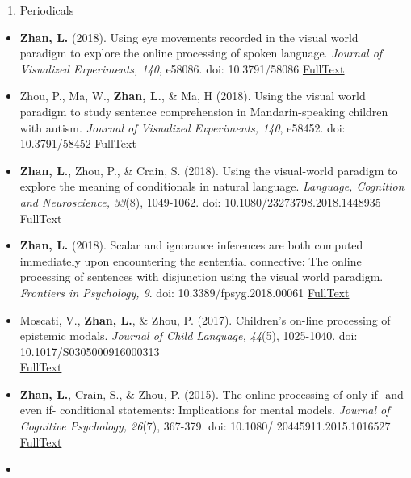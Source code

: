 \documentclass[10pt,]{article}
\providecommand{\tightlist}{%
  \setlength{\itemsep}{0pt}\setlength{\parskip}{0pt}}
\begin{document}
\begin{enumerate}
\def\labelenumi{\arabic{enumi}.}
\setcounter{enumi}{1}
\tightlist
\item
  Periodicals
\end{enumerate}

\begin{itemize}
\item
  \textbf{Zhan, L.} (2018). Using eye movements recorded in the visual
  world paradigm to explore the online processing of spoken language.
  \emph{Journal of Visualized Experiments, 140}, e58086. doi:
  10.3791/58086
  \href{https://publications.likan.info/jove-protocol-58086.pdf}{FullText}
\item
  Zhou, P., Ma, W., \textbf{Zhan, L.}, \& Ma, H (2018). Using the visual
  world paradigm to study sentence comprehension in Mandarin-speaking
  children with autism. \emph{Journal of Visualized Experiments, 140},
  e58452. doi: 10.3791/58452
  \href{https://publications.likan.info/jove-protocol-58452.pdf}{FullText}
\item
  \textbf{Zhan, L.}, Zhou, P., \& Crain, S. (2018). Using the
  visual-world paradigm to explore the meaning of conditionals in
  natural language. \emph{Language, Cognition and Neuroscience, 33}(8),
  1049-1062. doi: 10.1080/23273798.2018.1448935
  \href{https://publications.likan.info/LangCognNeurosci2018.pdf}{FullText}
\item
  \textbf{Zhan, L.} (2018). Scalar and ignorance inferences are both
  computed immediately upon encountering the sentential connective: The
  online processing of sentences with disjunction using the visual world
  paradigm. \emph{Frontiers in Psychology, 9}. doi:
  10.3389/fpsyg.2018.00061
  \href{https://www.frontiersin.org/articles/10.3389/fpsyg.2018.00061/full}{FullText}
\item
  Moscati, V., \textbf{Zhan, L.}, \& Zhou, P. (2017). Children's on-line
  processing of epistemic modals. \emph{Journal of Child Language,
  44}(5), 1025-1040. doi: 10.1017/S0305000916000313\\
   \href{https://publications.likan.info/JChildLang2016.pdf}{FullText}
\item
  \textbf{Zhan, L.}, Crain, S., \& Zhou, P. (2015). The online
  processing of only if- and even if- conditional statements:
  Implications for mental models. \emph{Journal of Cognitive Psychology,
  26}(7), 367-379. doi: 10.1080/ 20445911.2015.1016527
  \href{https://publications.likan.info/JCognPsychol2015.pdf}{FullText}
\item

\end{itemize}
\end{document}
